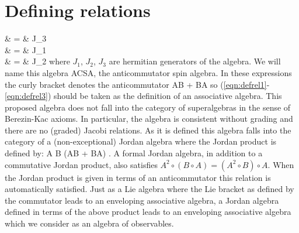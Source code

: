 \begin{comment}
The algebra of observables in quantum theory plays a fundamental
role. When classical systems are quantized, their classical
symmetry algebra acting on a set of physical observables, in
simplest examples, remains the same. For some completely
integrable non-linear models, consistent quantization requires
that the classical symmetry group be replaced by a quantum group
\cite{frt,drinfeld,woronowicz,manin} via a deformation parameter
$q = 1 + O(\hbar)$. In recent years quantum groups involving
fermions have received widespread attention. These include
deformed fermion algebras \cite{jx,xh,sm,chung}, spin chains
\cite{nt,gppr,bnnpsw} and Fermi gases \cite{ubriaco}. At the same
time, some quantum systems, most notably fermionic quantum systems
do not have any classical analogues. Nevertheless, fermions are
perhaps the most important sector of quantum phenomena. Motivated
by these considerations, we define a fermionic version of the
angular momentum algebra by the relations
\end{comment}


\section{Defining relations}

\bea
{} & = & J_3 \label{eqn:defrel1} \\
 & = & J_1 \label{eqn:defrel2} \\
 & = & J_2 \label{eqn:defrel3}
\eea
where $J_1$, $J_2$, $J_3$ are hermitian generators of the algebra. We will name this algebra ACSA, the anticommutator spin algebra. In these expressions the curly bracket denotes the anticommutator \beq
{} \equiv AB + BA \eeq so (\ref{eqn:defrel1}-\ref{eqn:defrel3}) should be taken as the
definition of an associative algebra. This proposed algebra does
not fall into the category of superalgebras in the sense of
Berezin-Kac axioms. In particular, the algebra is consistent
without grading and there are no (graded) Jacobi relations. As it
is defined this algebra falls into the category of a
(non-exceptional) Jordan algebra where the Jordan product is
defined by: \beq A \circ B \equiv {} (AB + BA) \quad . \eeq A
formal Jordan algebra, in addition to a commutative Jordan
product, also satisfies $A^2\circ(B\circ A) = (A^2\circ B)\circ
A$. When the Jordan product is given in terms of an anticommutator
this relation is automatically satisfied. Just as a Lie algebra
where the Lie bracket as defined by the commutator leads to an
enveloping associative algebra, a Jordan algebra defined in terms
of the above product leads to an enveloping associative algebra
which we consider as an algebra of observables.

